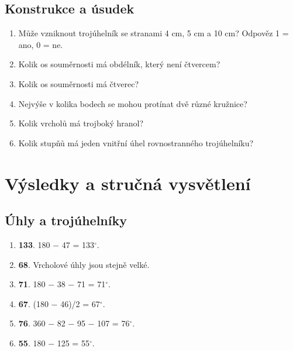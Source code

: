 \documentclass[11pt,a4paper]{article}
\newif\ifshowanswers
\begin{document}
\subsection*{Konstrukce a úsudek}
\begin{enumerate}[label=\arabic*.,start=37,leftmargin=*,itemsep=6pt]
\item Může vzniknout trojúhelník se stranami 4 cm, 5 cm a 10 cm? Odpověz 1 = ano, 0 = ne.\par\vspace{2mm}
\item Kolik os souměrnosti má obdélník, který není čtvercem?\par\vspace{2mm}
\item Kolik os souměrnosti má čtverec?\par\vspace{2mm}
\item Nejvýše v kolika bodech se mohou protínat dvě různé kružnice?\par\vspace{2mm}
\item Kolik vrcholů má trojboký hranol?\par\vspace{2mm}
\item Kolik stupňů má jeden vnitřní úhel rovnostranného trojúhelníku?\par\vspace{2mm}
\end{enumerate}
\ifshowanswers
\Needspace{140pt}
\section*{Výsledky a stručná vysvětlení}
\subsection*{Úhly a trojúhelníky}
\begin{enumerate}[label=\arabic*.,start=1,leftmargin=*,itemsep=3pt]
\item \textbf{133}. 180 $-$ 47 = 133$^\circ$.
\item \textbf{68}. Vrcholové úhly jsou stejně velké.
\item \textbf{71}. 180 $-$ 38 $-$ 71 = 71$^\circ$.
\item \textbf{67}. (180 $-$ 46)/2 = 67$^\circ$.
\item \textbf{76}. 360 $-$ 82 $-$ 95 $-$ 107 = 76$^\circ$.
\item \textbf{55}. 180 $-$ 125 = 55$^\circ$.
\end{enumerate}
\end{document}
